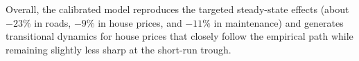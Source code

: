 Overall, the calibrated model reproduces the targeted steady-state effects (about \(-23\%\) in roads, \(-9\%\) in house prices, and \(-11\%\) in maintenance) and generates transitional dynamics for house prices that closely follow the empirical path while remaining slightly less sharp at the short-run trough.







